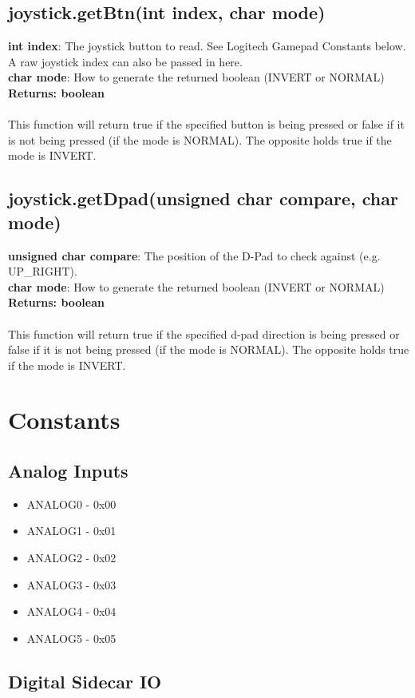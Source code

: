 \documentclass[11pt]{article} %
\begin{document}
\subsection{joystick.getBtn(int index, char mode)}
\textbf{int index}: The joystick button to read. See Logitech Gamepad Constants below. A raw joystick index can also be passed in here.\\
\textbf{char mode}: How to generate the returned boolean (INVERT or NORMAL)\\
\textbf{Returns: boolean}\\\\
This function will return true if the specified button is being pressed or false if it is not being pressed (if the mode is NORMAL). The opposite holds true if the mode is INVERT.
\subsection{joystick.getDpad(unsigned char compare, char mode)}
\textbf{unsigned char compare}: The position of the D-Pad to check against (e.g. UP\_RIGHT).\\
\textbf{char mode}: How to generate the returned boolean (INVERT or NORMAL)\\
\textbf{Returns: boolean}\\\\
This function will return true if the specified d-pad direction is being pressed or false if it is not being pressed (if the mode is NORMAL). The opposite holds true if the mode is INVERT.

\newpage
\section{Constants}

\subsection{Analog Inputs}
\begin{itemize}
\item ANALOG0 - 0x00
\item ANALOG1 - 0x01
\item ANALOG2 - 0x02
\item ANALOG3 - 0x03
\item ANALOG4 - 0x04
\item ANALOG5 - 0x05
\end{itemize}

\subsection{Digital Sidecar IO}
\end{document}
